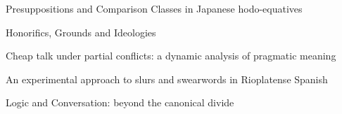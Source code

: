 \documentclass[12pt]{jarticle}
\begin{document}
      {Presuppositions and Comparison Classes in Japanese hodo-equatives}
      {}




  
      {Honorifics, Grounds and Ideologies}
      {}
  
      {Cheap talk under partial conflicts: a dynamic analysis of pragmatic meaning}
      {}
  
      {An experimental approach to slurs and swearwords in Rioplatense Spanish}
      {}




  
      {Logic and Conversation: beyond the canonical divide}
      {}







  
\end{document}
